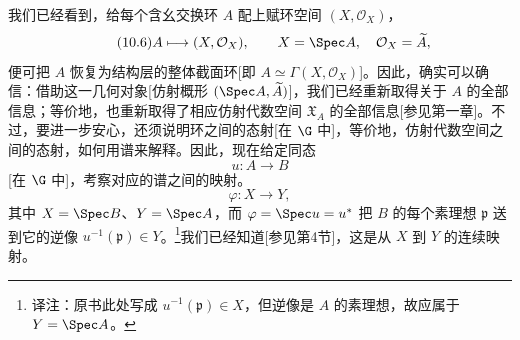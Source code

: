 我们已经看到，给每个含幺交换环 $A$ 配上赋环空间 $(X,\mathcal O_X)$，
\begin{equation}\tag{10.6}
A\longmapsto(X,\mathcal O_X),\qquad X=\Spec A,\quad\mathcal O_X=\widetilde A,
\end{equation}
便可把 $A$ 恢复为结构层的整体截面环[即 $A\simeq\Gamma(X,\mathcal O_X)$]。因此，确实可以确信：借助这一几何对象[仿射概形 $(\Spec A,\widetilde A)$]，我们已经重新取得关于 $A$ 的全部信息；等价地，也重新取得了相应仿射代数空间 $\mathfrak X_A$ 的全部信息[参见第一章]。不过，要进一步安心，还须说明环之间的态射[在 $\G$ 中]，等价地，仿射代数空间之间的态射，如何用谱来解释。因此，现在给定同态
\begin{equation}\tag{10.7}
u:A\longrightarrow B
\end{equation}
[在 $\G$ 中]，考察对应的谱之间的映射。
\begin{equation}\tag{10.8}
\varphi:X\longrightarrow Y,
\end{equation}
其中 $X=\Spec B$、$Y=\Spec A$，而 $\varphi=\Spec u=u^*$ 把 $B$ 的每个素理想 $\mathfrak p$ 送到它的逆像 $u^{-1}(\mathfrak p)\in Y$。\footnote{译注：原书此处写成 $u^{-1}(\mathfrak p)\in X$，但逆像是 $A$ 的素理想，故应属于 $Y=\Spec A$。}我们已经知道[参见第4节]，这是从 $X$ 到 $Y$ 的连续映射。

